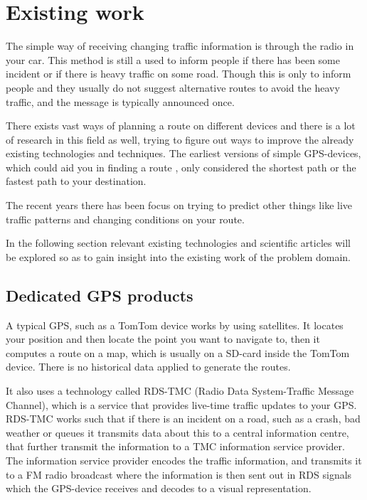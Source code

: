 \section{Existing work}
The simple way of receiving changing traffic information is through the radio in your car. This method is still a used to inform people if there has been some incident or if there is heavy traffic on some road. Though this is only to inform people and they usually do not suggest alternative routes to avoid the heavy traffic, and the message is typically announced once.  

There exists vast ways of planning a route on different devices and there is  a lot of research in this field as well, trying to figure out ways to improve the already existing technologies and techniques. The earliest versions of simple GPS-devices, which could aid you in finding a route , only considered the shortest path or the fastest path to your destination. 

The recent years there has been focus on trying to predict other things like live traffic patterns and changing conditions on your route.

In the following section relevant existing technologies and scientific articles will be explored so as to gain insight into the existing work of the problem domain.

\subsection*{Dedicated GPS products}
A typical GPS, such as a TomTom device works by using satellites. It locates your position and then locate the point you want to navigate to, then it computes a route on a map, which is usually on a SD-card inside the TomTom device. There is no historical data applied to generate the routes.

It also uses a technology called RDS-TMC (Radio Data System-Traffic Message Channel), which is a service that provides live-time traffic updates to your GPS. RDS-TMC works such that if there is an incident on a road, such as a crash, bad weather or queues it transmits data about this to a central information centre, that further transmit the information to a TMC information service provider. The information service provider encodes the traffic information, and transmits it to a FM radio broadcast where the information is then sent out in RDS signals which the GPS-device receives and decodes to a visual representation.

